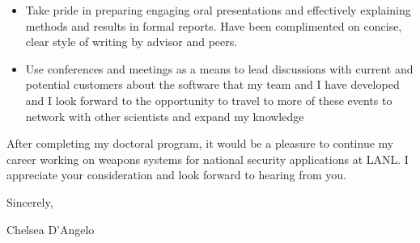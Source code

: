\begin{center}
\begin{minipage}{\textwidth}
\begin{itemize}[leftmargin=.875in,rightmargin=.875in,itemsep=1.0mm]
               \item Take pride in preparing engaging oral presentations and 
                     effectively explaining methods and results in 
                     formal reports.  Have been 
                     complimented on concise, clear
                     style of writing by advisor and peers. 
	       \item Use conferences and meetings as a means to lead
		       discussions with current and potential customers about
		       the software that my team and I have developed and I look forward to the opportunity to travel to
		       more of these events to network with other
			scientists and expand my knowledge
		       


\end{itemize} 

\vspace{5mm} %


\vspace{1.5mm}

After completing my doctoral program, it would be a pleasure 
to continue my career working on weapons systems for
national security applications at LANL.  
I appreciate your consideration and look forward to hearing from you. 
  \vspace{6mm}
  
  Sincerely, \\ \vspace{-4mm}
  
  
  Chelsea D'Angelo
  
  \endgroup
  
  \end{minipage}
\end{center}
